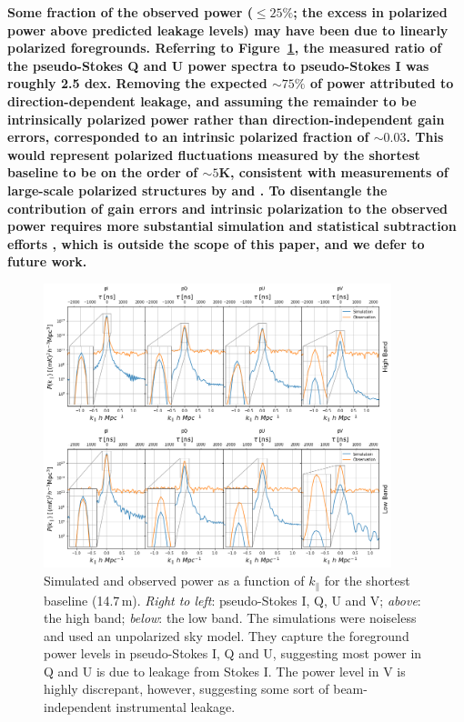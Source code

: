 \documentclass[twocolumn, trackchanges]{aastex61}
\newcommand{\edited}[1]{{\bf \color{red} #1}}
\begin{document}
{\edited{Some fraction of the observed power ($\leqslant 25\%$; the excess in polarized power above predicted leakage levels) may have been due to linearly polarized foregrounds. Referring to Figure~\ref{fig:bl0_cuts_vs_sim}, the measured ratio of the pseudo-Stokes Q and U power spectra to pseudo-Stokes I was roughly 2.5 dex. Removing the expected $\sim75\%$ of power attributed to direction-dependent leakage, and assuming the remainder to be intrinsically polarized power rather than direction-independent gain errors, corresponded to an intrinsic polarized fraction of $\sim 0.03$. This would represent polarized fluctuations measured by the shortest baseline to be on the order of $\sim 5$K, consistent with measurements of large-scale polarized structures by \cite{Jelic.15} and \cite{Lenc.16}. To disentangle the contribution of gain errors and intrinsic polarization to the observed power requires more substantial simulation and statistical subtraction efforts \citep[e.g.][]{Lenc.18}, which is outside the scope of this paper, and we defer to future work.}

%
\begin{figure}
\centering
\includegraphics[width=0.9\textwidth]{real_sim_compare.png}
\caption{Simulated and observed power as a function of $k_{\parallel}$ for the shortest baseline (14.7\,m). \textit{Right to left}: pseudo-Stokes I, Q, U and V; \textit{above}: the high band; \textit{below}: the low band. The simulations were noiseless and used an unpolarized sky model. They capture the foreground power levels in pseudo-Stokes I, Q and U, suggesting most power in Q and U is due to leakage from Stokes I. The power level in V is highly discrepant, however, suggesting some sort of beam-independent instrumental leakage.}
\label{fig:bl0_cuts_vs_sim}
\end{figure}

}
\end{document}
